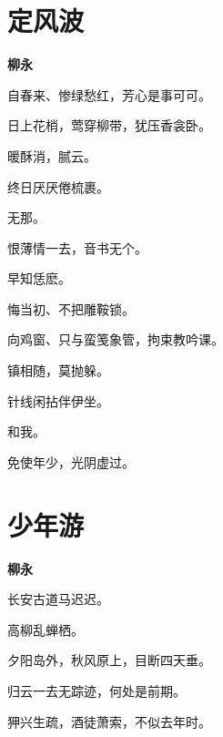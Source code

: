 \documentclass[12pt,a4paper]{ctexbook}
\begin{document}
\section{定风波}
\textbf{柳永}\par\vspace{0.5em}
自春来、惨绿愁红，芳心是事可可。\par
日上花梢，莺穿柳带，犹压香衾卧。\par
暖酥消，腻云。\par
终日厌厌倦梳裹。\par
无那。\par
恨薄情一去，音书无个。\par
早知恁麽。\par
悔当初、不把雕鞍锁。\par
向鸡窗、只与蛮笺象管，拘束教吟课。\par
镇相随，莫抛躲。\par
针线闲拈伴伊坐。\par
和我。\par
免使年少，光阴虚过。\par

\section{少年游}
\textbf{柳永}\par\vspace{0.5em}
长安古道马迟迟。\par
高柳乱蝉栖。\par
夕阳岛外，秋风原上，目断四天垂。\par
归云一去无踪迹，何处是前期。\par
狎兴生疏，酒徒萧索，不似去年时。\par
\end{document}
